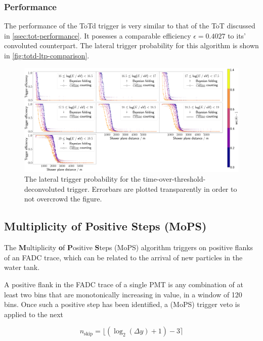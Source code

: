 \subsubsection{Performance}
\label{ssec:totd-performance}

The performance of the ToTd trigger is very similar to that of the ToT discussed in \autoref{ssec:tot-performance}. It posesses a comparable efficiency
$\epsilon = 0.4027$ to its' convoluted counterpart. The lateral trigger probability for this algorithm is shown in \autoref{fig:totd-ltp-comparison}.

\begin{figure}
	\centering
	\includegraphics[width=\textwidth]{./plots/totd_LTP_comparison.png}
	\caption{The lateral trigger probability for the time-over-threshold-deconvoluted trigger. Errorbars are plotted transparently in order to not overcrowd the 
	figure.} 
	\label{fig:totd-ltp-comparison}
\end{figure}

\subsection{Multiplicity of Positive Steps (MoPS)}
\label{ssec:multiplicity-of-positive-steps}

The \textbf{M}ultiplicity \textbf{o}f \textbf{P}ositive \textbf{S}teps (MoPS) algorithm triggers on positive flanks of an FADC trace, which can be related to the 
arrival of new particles in the water tank. 

A positive flank in the FADC trace of a single PMT is any combination of at least two bins that are monotonically increasing in value, in a window of 120 bins. 
Once such a positive step has been identified, a (MoPS) trigger veto is applied to the next 

\begin{equation}
    \label{eq:MoPS-veto}
    n_\text{skip} = \lfloor \left( \log_2(\Delta y) + 1 \right) - 3\rceil
\end{equation}

